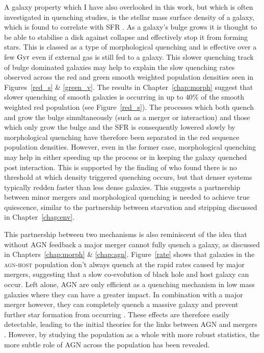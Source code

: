 A galaxy property which I have also overlooked in this work, but which is often investigated in quenching studies, is the stellar mass surface density of a galaxy, which is found to correlate with SFR \citep{barro13b, whitaker16}. As a galaxy's bulge grows it is thought to be able to stabilise a disk against collapse and effectively stop it from forming stars. This is classed as a type of morphological quenching and is effective over a few $\rm{Gyr}$ \citep{Fang13} even if external gas is still fed to a galaxy. This slower quenching track of bulge dominated galaxies may help to explain the slow quenching rates observed across the red and green smooth weighted population densities seen in Figures~\ref{red_s} \& \ref{green_v}. The results in Chapter~\ref{chap:morph} suggest that slower quenching of smooth galaxies is occurring in up to $40\%$ of the smooth weighted red population (see Figure~\ref{red_s}). The processes which both quench and grow the bulge simultaneously (such as a merger or interaction) and those which only grow the bulge and the SFR is consequently lowered slowly by morphological quenching have therefore been separated in the red sequence population densities. However, even in the former case, morphological quenching may help in either speeding up the process or in keeping the galaxy quenched post interaction. This is supported by the finding of \cite{abramson16} who found there is no threshold at which density triggered quenching occurs, but that denser systems typically redden faster than less dense galaxies. This suggests a partnership between minor mergers and morphological quenching is needed to achieve true quiescence, similar to the partnership between starvation and stripping discussed in Chapter~\ref{chap:env}. 

This partnership between two mechanisms is also reminiscent of the idea that without AGN feedback a major merger cannot fully quench a galaxy, as discussed in Chapters~\ref{chap:morph} \& \ref{chap:agn}. Figure~\ref{rate} shows that galaxies in the \textsc{agn-host} population don't always quench at the rapid rates caused by major mergers, suggesting that a slow co-evolution of black hole and host galaxy can occur. Left alone, AGN are only efficient as a quenching mechanism in low mass galaxies where they can have a greater impact. In combination with a major merger however, they can completely quench a massive galaxy and prevent further star formation from occurring \citep{conselice03, springel05b, hopkins08a}. These effects are therefore easily detectable, leading to the initial theories for the links between AGN and mergers \citep{merritt01, hopkins06b, hopkins08a, hopkins08b, peng07, jahnke11}. However, by studying the population as a whole with more robust statistics, the more subtle role of AGN across the population has been revealed. 

